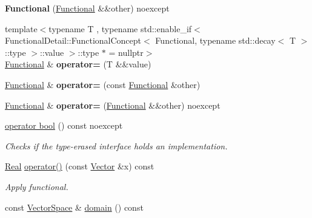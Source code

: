 \begin{DoxyCompactItemize}
\item 
{\bfseries Functional} (\hyperlink{classSpacy_1_1Functional}{Functional} \&\&other) noexcept\hypertarget{classSpacy_1_1Functional_acc54a58265520b36b731fceecc4a1c4c}{}\label{classSpacy_1_1Functional_acc54a58265520b36b731fceecc4a1c4c}

\item 
{\footnotesize template$<$typename T , typename std\+::enable\+\_\+if$<$ Functional\+Detail\+::\+Functional\+Concept$<$ Functional, typename std\+::decay$<$ T $>$\+::type $>$\+::value $>$\+::type $\ast$  = nullptr$>$ }\\\hyperlink{classSpacy_1_1Functional}{Functional} \& {\bfseries operator=} (T \&\&value)\hypertarget{classSpacy_1_1Functional_a90fe7e1ba7e375f6bb8875b9e927a8d7}{}\label{classSpacy_1_1Functional_a90fe7e1ba7e375f6bb8875b9e927a8d7}

\item 
\hyperlink{classSpacy_1_1Functional}{Functional} \& {\bfseries operator=} (const \hyperlink{classSpacy_1_1Functional}{Functional} \&other)\hypertarget{classSpacy_1_1Functional_a67ea20b009963ddd56cae82a6ddf620a}{}\label{classSpacy_1_1Functional_a67ea20b009963ddd56cae82a6ddf620a}

\item 
\hyperlink{classSpacy_1_1Functional}{Functional} \& {\bfseries operator=} (\hyperlink{classSpacy_1_1Functional}{Functional} \&\&other) noexcept\hypertarget{classSpacy_1_1Functional_ab4d6af3a14920177cbe2610a9951ad88}{}\label{classSpacy_1_1Functional_ab4d6af3a14920177cbe2610a9951ad88}

\item 
\hyperlink{classSpacy_1_1Functional_a9389924b8e141796b02879a26f37d7b0}{operator bool} () const noexcept
\begin{DoxyCompactList}\small\item\em Checks if the type-\/erased interface holds an implementation. \end{DoxyCompactList}\item 
\hyperlink{classSpacy_1_1Real}{Real} \hyperlink{classSpacy_1_1Functional_af51f903133f2fbf92cf12f790e429919}{operator()} (const \hyperlink{classSpacy_1_1Vector}{Vector} \&x) const \hypertarget{classSpacy_1_1Functional_af51f903133f2fbf92cf12f790e429919}{}\label{classSpacy_1_1Functional_af51f903133f2fbf92cf12f790e429919}

\begin{DoxyCompactList}\small\item\em Apply functional. \end{DoxyCompactList}\item 
const \hyperlink{classSpacy_1_1VectorSpace}{Vector\+Space} \& \hyperlink{classSpacy_1_1Functional_a6f4ada552c025579bcce852316a071be}{domain} () const \hypertarget{classSpacy_1_1Functional_a6f4ada552c025579bcce852316a071be}{}\label{classSpacy_1_1Functional_a6f4ada552c025579bcce852316a071be}


\end{DoxyCompactItemize}
